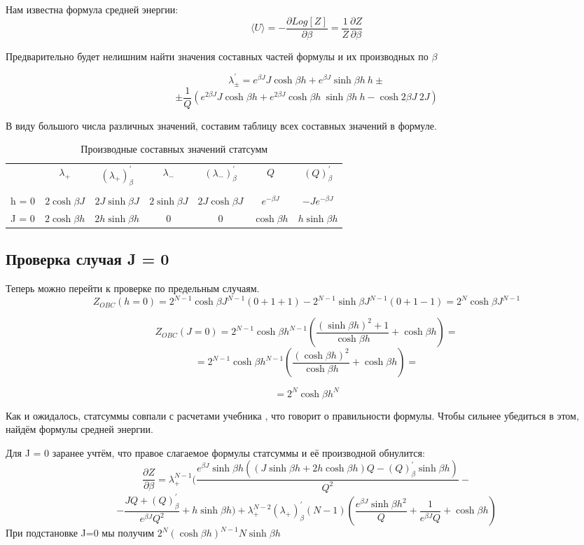 \documentclass{article}
\newcommand{\bj}{\beta J}
\newcommand{\dbj}{2 \bj}
\newcommand{\bh}{\beta h}
\newcommand{\lp}{\lambda_{+}}
\newcommand{\lm}{\lambda_{-}}
\newcommand{\obc}{_{OBC}}
\newcommand{\dzdb}{\frac{\partial Z}{\partial \beta}}
\newcommand{\la}{\langle}
\newcommand{\ra}{\rangle}
\numberwithin{equation}{section}
\begin{document}
Нам известна формула средней энергии:
\begin{equation}\label{MeanE}
    \la U \ra = -\frac{\partial Log[Z]}{\partial \beta} = \frac{1}{Z} \dzdb
\end{equation}

Предварительно будет нелишним найти значения составных частей формулы и их производных по $\beta$

\[ \lambda_{\pm}^{'} = e^{\bj}J\cosh{\bh} + e^{\bj}\sinh{\bh}\ h \pm \]
\[\pm \frac{1}{Q}  (e^{\dbj}J\cosh{\bh} + e^{\dbj}\cosh{\bh}\ \sinh{\bh}\ h - \cosh{\dbj}\ 2J) \] 

В виду большого числа различных значений, составим таблицу всех составных значений в формуле.
\begin{table}[h!]\label{derLTab}
    \centering
    \begin{tabular}{c c c c c c c}
         & $\lp$ & $(\lp)^{'}_{\beta}$ & $\lm$ & $(\lm)^{'}_{\beta}$ & $Q$ & $(Q)^{'}_{\beta}$  \\ \\
        h = 0 & $2\cosh{\bj}$ & $2J\sinh{\bj}$ & $2\sinh{\bj}$ & $2J\cosh{\bj}$ & $e^{-\bj}$ & $-J e^{-\bj}$ \\
        J = 0 & $2\cosh{\bh}$ & $2h\sinh{\bh}$ & $0$ & $0$ & $\cosh{\bh}$ & $h\sinh{\bh}$\\
    \end{tabular}
    \caption{Производные составных значений статсумм}
\end{table}



\subsection{Проверка случая J = 0}

Теперь можно перейти к проверке по предельным случаям.
\[ Z\obc(h = 0) = 2^{N-1}\cosh{\bj}^{N-1} (0 + 1 + 1) - 2^{N-1}\sinh{\bj}^{N-1} (0 + 1 - 1) = 2^{N}\cosh{\bj}^{N-1}\]

\[ Z\obc(J = 0) = 2^{N-1}\cosh{\bh}^{N-1} (\frac{(\sinh{\bh})^{2} + 1}{\cosh{\bh}} +\cosh{\bh}) = \]
\[=2^{N-1}\cosh{\bh}^{N-1} (\frac{(\cosh{\bh})^{2}}{\cosh{\bh}} +\cosh{\bh}) = \]

\[= 2^{N}\cosh{\bh}^{N}\]

Как и ожидалось, статсуммы совпали с расчетами учебника \cite{Swen}, что говорит о правильности формулы. Чтобы сильнее убедиться в этом, найдём формулы средней энергии. 

Для J = 0 заранее учтём, что правое слагаемое формулы статсуммы и её производной обнулится:
\[\dzdb = \lp^{N-1}(\frac{e^{\bj}\sinh{\bh}((J\sinh{\bh} + 2h\cosh{\bh})Q - (Q)^{'}_{\beta}\sinh{\bh})}{Q^{2}} - \]
\[ - \frac{J Q + (Q)^{'}_{\beta}}{e^{\bj} Q^{2}} + h\sinh{\bh}) + \lp^{N-2} (\lp)^{'}_{\beta}(N-1)(\frac{e^{\bj} \sinh{\bh}^2}{Q} + \frac{1}{e^{\bj}Q} + \cosh{\bh})\]
При подстановке J=0 мы получим $2^{N}(\cosh{\bh})^{N-1}N\sinh{\bh}$
\end{document}
